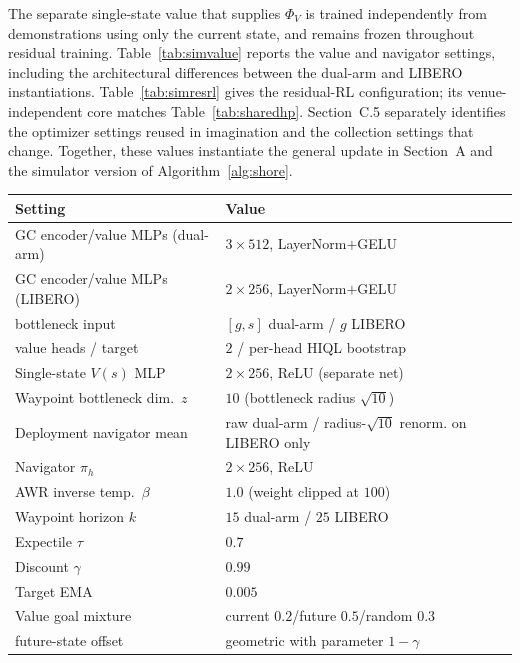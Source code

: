 \documentclass[letterpaper]{article} %
\begin{document}
The separate single-state value that supplies $\Phi_V$ is trained independently from
demonstrations using only the current state, and remains frozen throughout residual
training. Table~\ref{tab:simvalue} reports the value and navigator settings, including
the architectural differences between the dual-arm and LIBERO instantiations.
Table~\ref{tab:simresrl} gives the residual-RL configuration; its venue-independent
core matches Table~\ref{tab:sharedhp}. Section~C.5 separately identifies the optimizer
settings reused in imagination and the collection settings that change. Together,
these values instantiate the general update in Section~A and the simulator version of
Algorithm~\ref{alg:shore}.

\begin{table}[t]
\centering\small\setlength{\tabcolsep}{4pt}
\begin{tabular}{@{}p{}p{}@{}}
\toprule
Setting & Value \\
\midrule
GC encoder/value MLPs (dual-arm)     & $3\times512$, LayerNorm$+$GELU \\
GC encoder/value MLPs (LIBERO)       & $2\times256$, LayerNorm$+$GELU \\
\quad bottleneck input               & $[g,s]$ dual-arm / $g$ LIBERO \\
\quad value heads / target           & $2$ / per-head HIQL bootstrap \\
Single-state $V(s)$ MLP              & $2\times256$, ReLU (separate net) \\
Waypoint bottleneck dim.\ $z$        & $10$ (bottleneck radius $\sqrt{10}$) \\
Deployment navigator mean             & raw dual-arm / radius-$\sqrt{10}$ renorm. on LIBERO only \\
Navigator $\pi_h$                    & $2\times256$, ReLU \\
\quad AWR inverse temp.\ $\beta$      & $1.0$ (weight clipped at $100$) \\
Waypoint horizon $k$                 & $15$ dual-arm / $25$ LIBERO \\
Expectile $\tau$                     & $0.7$ \\
Discount $\gamma$                    & $0.99$ \\
Target EMA                           & $0.005$ \\
Value goal mixture                   & current $0.2$/future $0.5$/random $0.3$ \\
\quad future-state offset            & geometric with parameter $1{-}\gamma$ \\

\end{tabular}
\end{table}
\end{document}

